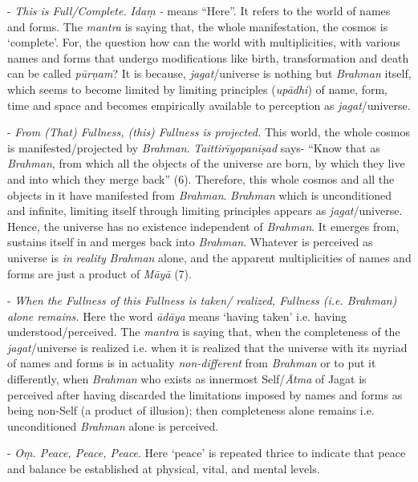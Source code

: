 - \emph{This is Full/Complete.} \emph{Idaṃ -} means ``Here''. It refers to the world of names and forms. The \emph{mantra} is saying that, the whole manifestation, the cosmos is `complete'. For, the question how can the world with multiplicities, with various names and forms that undergo modifications like birth, transformation and death can be called \emph{pūrṇam}? It is because, \emph{jagat}/universe is nothing but \emph{Brahman} itself, which seems to become limited by limiting principles (\emph{upādhi}) of name, form, time and space and becomes empirically available to perception as \emph{jagat}/universe.

- \emph{From (That) Fullness, (this) Fullness is projected.} This world, the whole cosmos is manifested/projected by \emph{Brahman}. \emph{Taittirīyopaniṣad} says- ``Know that as \emph{Brahman}, from which all the objects of the universe are born, by which they live and into which they merge back'' (6). Therefore, this whole cosmos and all the objects in it have manifested from \emph{Brahman}. \emph{Brahman} which is unconditioned and infinite, limiting itself through limiting principles appears as \emph{jagat}/universe. Hence, the universe has no existence independent of \emph{Brahman}. It emerges from, sustains itself in and merges back into \emph{Brahman}. Whatever is perceived as universe is \emph{in} \emph{reality} \emph{Brahman} alone, and the apparent multiplicities of names and forms are just a product of \emph{Māyā} (7).

- \emph{When the Fullness of this Fullness is taken/ realized, Fullness (i.e. Brahman) alone remains.} Here the word \emph{ādāya} means `having taken' i.e. having understood/perceived. The \emph{mantra} is saying that, when the completeness of the \emph{jagat}/universe is realized i.e. when it is realized that the universe with its myriad of names and forms is in actuality \emph{non-different} from \emph{Brahman} or to put it differently, when \emph{Brahman} who exists as innermost Self/\emph{Ātma} of Jagat is perceived after having discarded the limitations imposed by names and forms as being non-Self (a product of illusion); then completeness alone remains i.e. unconditioned \emph{Brahman} alone is perceived.

- \emph{Oṃ. Peace, Peace, Peace}. Here `peace' is repeated thrice to indicate that peace and balance be established at physical, vital, and mental levels.

